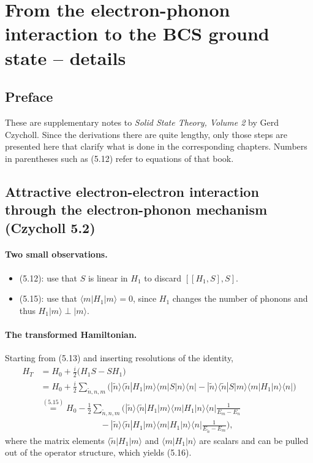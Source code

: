 \documentclass[../../main.tex]{subfiles}
\begin{document}
\section{From the electron-phonon interaction to the BCS ground state -- details}
\label{sec:froehlich-to-bcs_details}

\subsection{Preface}


These are supplementary notes to \emph{Solid State Theory, Volume 2} by Gerd Czycholl.
Since the derivations there are quite lengthy, only those steps are presented here that
clarify what is done in the corresponding chapters. Numbers in parentheses such as
(5.12) refer to equations of that book.

\subsection{Attractive electron-electron interaction through the electron-phonon
mechanism (Czycholl 5.2)}
\label{sec:bcs-el-ph_details}

\paragraph{Two small observations.}
\begin{itemize}
\item (5.12): use that $S$ is linear in $H_1$ to discard $[[H_1,S],S]$.
\item (5.15): use that $\langle m|H_1|m\rangle=0$, since $H_1$ changes the number of
      phonons and thus $H_1|m\rangle\perp|m\rangle$.
\end{itemize}

\paragraph{The transformed Hamiltonian.}
Starting from (5.13) and inserting resolutions of the identity,
\begin{align}
H_T &= H_0+\frac{i}{2}\big(H_1S-SH_1\big)\\
&= H_0+\frac{i}{2}\sum_{\tilde n,n,m}\Big(
   |\tilde n\rangle\langle\tilde n|H_1|m\rangle\langle m|S|n\rangle\langle n|
 - |\tilde n\rangle\langle\tilde n|S|m\rangle\langle m|H_1|n\rangle\langle n|\Big)\\
&\overset{(5.15)}{=} H_0-\frac{1}{2}\sum_{\tilde n,n,m}\Big(
   |\tilde n\rangle\langle\tilde n|H_1|m\rangle\langle m|H_1|n\rangle\langle n|
   \frac{1}{E_m-E_n}\nonumber\\
&\hspace{7em}
 - |\tilde n\rangle\langle\tilde n|H_1|m\rangle\langle m|H_1|n\rangle\langle n|
   \frac{1}{E_{\tilde n}-E_m}\Big),
\end{align}
where the matrix elements $\langle\tilde n|H_1|m\rangle$ and $\langle m|H_1|n\rangle$ are
scalars and can be pulled out of the operator structure, which yields (5.16).
\end{document}
